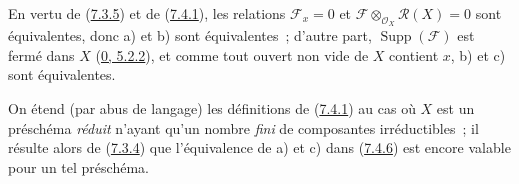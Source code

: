 En vertu de (\hyperref[I.7.3.5-fr]{7.3.5}) et de
(\hyperref[I.7.4.1-fr]{7.4.1}), les relations $\mathscr{F}_x=0$ et
$\mathscr{F}\otimes_{\mathscr{O}_X}\mathscr{R}(X)=0$ sont équivalentes, donc
a) et b) sont équivalentes~; d'autre part,
$\operatorname{Supp}(\mathscr{F})$ est fermé dans $X$
(\hyperref[0.5.2.2-fr]{0, 5.2.2}), et comme tout ouvert non vide de $X$
contient $x$, b) et c) sont équivalentes.

\begin{env}[7.4.7]
\label{I.7.4.7-fr}
On étend (par abus de langage) les définitions de
(\hyperref[I.7.4.1-fr]{7.4.1}) au cas où $X$ est un préschéma
\emph{réduit} n'ayant qu'un nombre \emph{fini} de composantes irréductibles~;
il résulte alors de (\hyperref[I.7.3.4-fr]{7.3.4}) que l'équivalence de a) et
c) dans (\hyperref[I.7.4.6-fr]{7.4.6}) est encore valable pour un tel
préschéma.
\end{env}
